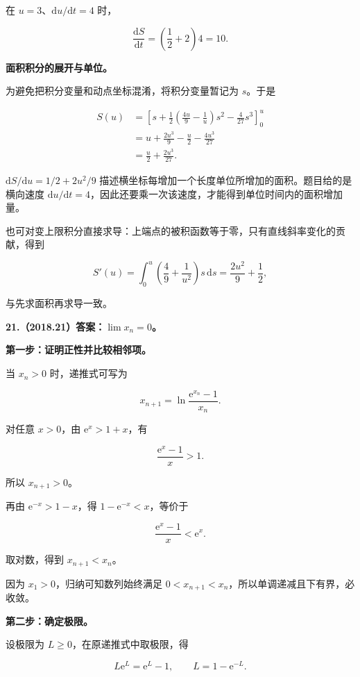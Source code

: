 \documentclass[UTF8,11pt,fontset=windows]{ctexart}
\begin{document}
在 $u=3$、$\mathrm du/\mathrm dt=4$ 时，

$$
\frac{\mathrm dS}{\mathrm dt}
=\left(\frac12+2\right)4=10.
$$

\textbf{面积积分的展开与单位。}

为避免把积分变量和动点坐标混淆，将积分变量暂记为 $s$。于是

$$
\begin{aligned}
S(u)
&=\left[s+\frac12\left(\frac{4u}{9}-\frac1u\right)s^2-\frac4{27}s^3\right]_0^u\\
&=u+\frac{2u^3}{9}-\frac u2-\frac{4u^3}{27}\\
&=\frac u2+\frac{2u^3}{27}.
\end{aligned}
$$

$\mathrm dS/\mathrm du=1/2+2u^2/9$ 描述横坐标每增加一个长度单位所增加的面积。题目给的是横向速度 $\mathrm du/\mathrm dt=4$，因此还要乘一次该速度，才能得到单位时间内的面积增加量。

也可对变上限积分直接求导：上端点的被积函数等于零，只有直线斜率变化的贡献，得到

$$
S'(u)=\int_0^u\left(\frac49+\frac1{u^2}\right)s\,\mathrm ds
=\frac{2u^2}{9}+\frac12,
$$

与先求面积再求导一致。

\clearpage

\textbf{21.（2018.21）答案：$\lim x_n=0$。}

\textbf{第一步：证明正性并比较相邻项。}

当 $x_n>0$ 时，递推式可写为

$$
x_{n+1}=\ln\frac{\mathrm e^{x_n}-1}{x_n}.
$$

对任意 $x>0$，由 $\mathrm e^x>1+x$，有

$$
\frac{\mathrm e^x-1}{x}>1.
$$

所以 $x_{n+1}>0$。

再由 $\mathrm e^{-x}>1-x$，得 $1-\mathrm e^{-x}<x$，等价于

$$
\frac{\mathrm e^x-1}{x}<\mathrm e^x.
$$

取对数，得到 $x_{n+1}<x_n$。

因为 $x_1>0$，归纳可知数列始终满足 $0<x_{n+1}<x_n$，所以单调递减且下有界，必收敛。

\textbf{第二步：确定极限。}

设极限为 $L\ge0$，在原递推式中取极限，得

$$
L\mathrm e^L=\mathrm e^L-1,
\qquad L=1-\mathrm e^{-L}.
$$
\end{document}
